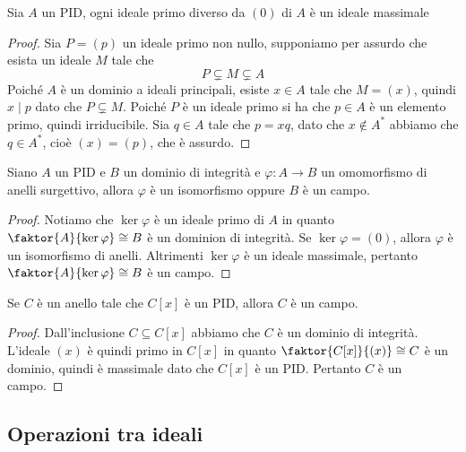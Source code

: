 \documentclass[11pt]{scrartcl}
\begin{document}
	\begin{proposition}
		Sia $A$ un PID, ogni ideale primo diverso da $(0)$ di $A$ è un ideale 
		massimale
	\end{proposition}
	
	\begin{proof}
		Sia $P = (p)$ un ideale primo non nullo, supponiamo per assurdo che esista
		un ideale $M$ tale che 
		\[
		P \subsetneq M \subsetneq A
		\]
		Poiché $A$ è un dominio a ideali principali, esiste $x \in A$ tale che 
		$M = (x)$, quindi $x \mid p$ dato che $P \subsetneq M$. Poiché $P$ è 
		un ideale primo si ha che $p \in A$ è un elemento primo, quindi 
		irriducibile. Sia $q \in A$ tale che $p = xq$, dato che $x \notin A^*$ abbiamo che 
		$q \in A^*$, cioè $(x) = (p)$, che è assurdo.
	\end{proof}
	
	\begin{corollary}
		Siano $A$ un PID e $B$ un dominio di integrità e $\varphi: A \longrightarrow B$
		un omomorfismo di anelli surgettivo, allora $\varphi$ è un isomorfismo
		oppure $B$ è un campo. 
	\end{corollary}
	
	\begin{proof}
		Notiamo che $\ker \varphi$ è un ideale primo di $A$ in quanto $\faktor{A}{\ker\varphi}
		\cong B$ è un dominion di integrità. Se $\ker\varphi = (0)$, allora 
		$\varphi$ è un isomorfismo di anelli. Altrimenti $\ker\varphi$ è un ideale
		massimale, pertanto $\faktor{A}{\ker\varphi}\cong B$ è un campo.
	\end{proof}
	
	\begin{corollary}
		Se $C$ è un anello tale che $C[x]$ è un PID, allora $C$ è un campo.
	\end{corollary}
	
	\begin{proof}
		Dall'inclusione $C \subseteq C[x]$ abbiamo che $C$ è un dominio di integrità.
		L'ideale $(x)$ è quindi primo in $C[x]$ in quanto $\faktor{C[x]}{(x)} \cong C$
		è un dominio, quindi è massimale dato che $C[x]$ è un PID. Pertanto 
		$C$ è un campo.
	\end{proof}
	
	\newpage
	
	\subsection{Operazioni tra ideali}
	
\end{document}
